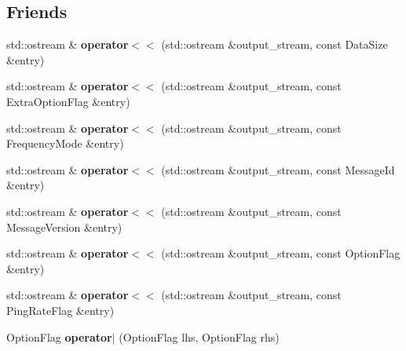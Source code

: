 \subsection*{Friends}
\begin{DoxyCompactItemize}
\item 
\mbox{\label{classOculusDriver_aec109b2038e7ebb6250b1ce4e4bcb5e2}} 
std\+::ostream \& {\bfseries operator$<$$<$} (std\+::ostream \&output\+\_\+stream, const Data\+Size \&entry)
\item 
\mbox{\label{classOculusDriver_a13cd7233c1967b1e26dc093cd153dbd6}} 
std\+::ostream \& {\bfseries operator$<$$<$} (std\+::ostream \&output\+\_\+stream, const Extra\+Option\+Flag \&entry)
\item 
\mbox{\label{classOculusDriver_abd3808b4866716f9cb7f762db75b7419}} 
std\+::ostream \& {\bfseries operator$<$$<$} (std\+::ostream \&output\+\_\+stream, const Frequency\+Mode \&entry)
\item 
\mbox{\label{classOculusDriver_afb3fd2fbb5122daf96b662a782190102}} 
std\+::ostream \& {\bfseries operator$<$$<$} (std\+::ostream \&output\+\_\+stream, const Message\+Id \&entry)
\item 
\mbox{\label{classOculusDriver_adb709e09e51cb145c84a68b610cf65b7}} 
std\+::ostream \& {\bfseries operator$<$$<$} (std\+::ostream \&output\+\_\+stream, const Message\+Version \&entry)
\item 
\mbox{\label{classOculusDriver_a5b9b14c322669bd6e4e7fe3a495b295d}} 
std\+::ostream \& {\bfseries operator$<$$<$} (std\+::ostream \&output\+\_\+stream, const Option\+Flag \&entry)
\item 
\mbox{\label{classOculusDriver_a32347a96ba0ba0b3cca308982db66b8e}} 
std\+::ostream \& {\bfseries operator$<$$<$} (std\+::ostream \&output\+\_\+stream, const Ping\+Rate\+Flag \&entry)
\item 
\mbox{\label{classOculusDriver_a1062cf45926bbc5101ff4b17db478e01}} 
Option\+Flag {\bfseries operator$\vert$} (Option\+Flag lhs, Option\+Flag rhs)
\item 

\end{DoxyCompactItemize}
